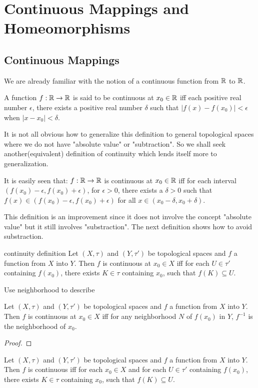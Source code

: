 \chapter{Continuous Mappings and Homeomorphisms}\label{1_2}

\section{Continuous Mappings}
We are already familiar with the notion of a continuous function from $\mathbb{R}$ to $\mathbb{R}$.
\par
A function $f:\mathbb{R}\rightarrow \mathbb{R}$ is said to be continuous at $x_0\in \mathbb{R}$ iff each positive real number $\epsilon$, 
there exists a positive real number $\delta$ such that $|f(x)-f(x_0)|<\epsilon$ when $|x-x_0|<\delta$. 
\par
It is not all obvious how to generalize this definition to general topological spaces where we do not have 
"absolute value" or "subtraction". So we shall seek another(equivalent) definition of continuity which lends itself more to 
generalization. 

It is easily seen that: $f:\mathbb{R}\rightarrow \mathbb{R}$ is continuous at $x_0\in\mathbb{R}$ iff for each interval $(f(x_0)-\epsilon, f(x_0)+\epsilon)$, 
for $\epsilon>0$, there exists a $\delta>0$ such that $f(x)\in(f(x_0)-\epsilon, f(x_0)+\epsilon)$ for all $x\in(x_0-\delta,x_0+\delta)$.
\par
This definition is an improvement since it does not involve the concept "absolute value" but it still involves "substraction". 
The next definition shows how to avoid substraction.

\begin{definition}{}{continuity definition}
    Let $(X,\tau)$ and $(Y,\tau')$ be topological spaces and $f$ a function from $X$ into $Y$.
    Then $f$ is continuous at $x_0\in X$ iff
    for each $U\in \tau'$ containing $f(x_0)$, there exists $K\in\tau$ containing $x_0$, such that $f(K)\subseteq U$.
\end{definition}
Use neighborhood to describe
\begin{proposition}{}{}
    Let $(X,\tau)$ and $(Y,\tau')$ be topological spaces and $f$ a function from $X$ into $Y$.
    Then $f$ is continuous at $x_0\in X$ iff for any neighborhood $N$ of $f(x_0)$ in $Y$, $f^{-1}$ is the neighborhood of $x_0$.
\end{proposition}
\begin{proof}
    
\end{proof}
\begin{definition}{}{}
    Let $(X,\tau)$ and $(Y,\tau')$ be topological spaces and $f$ a function from $X$ into $Y$.
    Then $f$ is continuous iff for each $x_0\in X$ and for each $U\in \tau'$ containing $f(x_0)$, 
    there exists $K\in\tau$ containing $x_0$, such that $f(K)\subseteq U$.
\end{definition}

